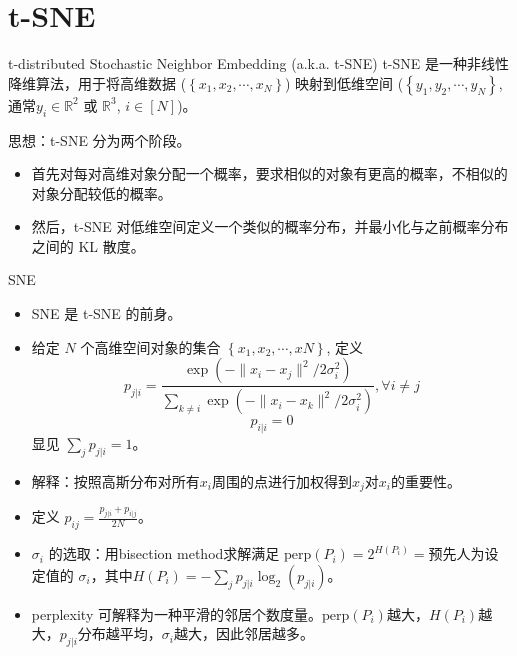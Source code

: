 \section{t-SNE}

\begin{frame}{t-distributed Stochastic Neighbor Embedding (a.k.a. t-SNE)}
    t-SNE 是一种非线性降维算法，用于将高维数据 ($\left\{ x_1, x_2, \cdots, x_N \right\} $) 映射到低维空间 ($\left\{ y_1, y_2, \cdots, y_N \right\} $, 通常$y_i \in \mathbb{R}^{2}$ 或 $\mathbb{R}^{3}$, $i\in [N]$)。

    思想：t-SNE 分为两个阶段。
    \begin{itemize}
        \item 首先对每对高维对象分配一个概率，要求相似的对象有更高的概率，不相似的对象分配较低的概率。
        \item 然后，t-SNE 对低维空间定义一个类似的概率分布，并最小化与之前概率分布之间的 KL 散度。
    \end{itemize}
\end{frame}

\begin{frame}{SNE}
    \begin{itemize}
        \item SNE 是 t-SNE 的前身。
        \item 给定 $N$ 个高维空间对象的集合 $\left\{ x_1, x_2, \cdots, xN \right\} $, 定义
        \[
            p_{j|i} = \frac{\exp(-\|x_i - x_j\|^2 / 2\sigma_i^2)}{\sum_{k \neq i} \exp(-\|x_i - x_k\|^2 / 2\sigma_i^2)}, \forall i \neq  j
        \]
        \[
            p_{i|i} = 0
        \]
        显见 $ \sum_{j} p_{j|i} = 1$。
        \item 解释：按照高斯分布对所有$x_i$周围的点进行加权得到$x_j$对$x_i$的重要性。
        \item 定义 $p_{ij} = \frac{p_{j|i}+ p_{i|j}}{2N}$。
        \item $\sigma_i$ 的选取：用bisection method求解满足 $\text{perp}(P_i) = 2^{H(P_i)} = $预先人为设定值的 $\sigma_i$，其中$H(P_i) = - \sum_{j} p_{j|i} \log_2(p_{j|i})$。
        \item perplexity 可解释为一种平滑的邻居个数度量。$\text{perp}(P_i)$越大，$H(P_i)$越大，$p_{j|i}$分布越平均，$\sigma_i$越大，因此邻居越多。
    \end{itemize}
\end{frame}

